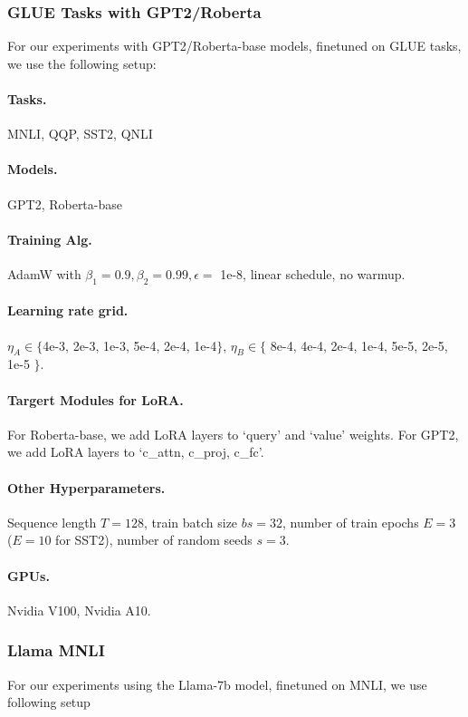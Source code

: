 \subsubsection{GLUE Tasks with GPT2/Roberta}

For our experiments with GPT2/Roberta-base models, finetuned on GLUE tasks, we use the following setup:

\paragraph{Tasks. } MNLI, QQP, SST2, QNLI

\paragraph{Models.} GPT2, Roberta-base

\paragraph{Training Alg.} AdamW with $\beta_1=0.9, \beta_2=0.99, \epsilon = $ 1e-8, linear schedule, no warmup. 

\paragraph{Learning rate grid.} $\eta_A \in \{$4e-3, 2e-3, 1e-3, 5e-4, 2e-4, 1e-4$\}$, $\eta_B \in \{$ 8e-4, 4e-4, 2e-4, 1e-4, 5e-5, 2e-5, 1e-5 $\}$.

\paragraph{Targert Modules for LoRA.} For Roberta-base, we add LoRA layers to `query' and `value' weights. For GPT2, we add LoRA layers to `c\_attn, c\_proj, c\_fc'.

\paragraph{Other Hyperparameters.} Sequence length $T=128$, train batch size $bs = 32$, number of train epochs $E=3$ ($E=10$ for SST2), number of random seeds $s=3$.


\paragraph{GPUs. } Nvidia V100, Nvidia A10.



\subsubsection{Llama MNLI}
For our experiments using the Llama-7b model, finetuned on MNLI, we use following setup


